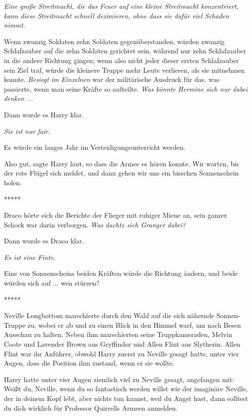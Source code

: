 \emph{Eine große Streitmacht, die das Feuer auf eine kleine Streitmacht
konzentriert, kann diese Streitmacht schnell dezimieren, ohne dass sie dafür
viel Schaden nimmt.}

Wenn zwanzig Soldaten zehn Soldaten gegenüberstanden, würden zwanzig
Schlafzauber auf die zehn Soldaten gerichtet sein, während nur zehn Schlafzauber
in die andere Richtung gingen; wenn also nicht jeder dieser ersten Schlafzauber
sein Ziel traf, würde die kleinere Truppe mehr Leute verlieren, als sie
mitnehmen konnte. \emph{Besiegt im Einzelnen} war der militärische Ausdruck für
das, was passierte, wenn man seine Kräfte so aufteilte. \emph{Was könnte Hermine
sich nur dabei denken ...}

Dann wurde es Harry klar.

\emph{Sie ist nur fair.}

Es würde ein langes Jahr im Verteidigungsunterricht werden.

\glqq{}Also gut\grqq{}, sagte Harry laut, so dass die Armee es hören konnte.
\glqq{}Wir warten, bis der rote Flügel sich meldet, und dann gehen wir uns ein
bisschen Sonnenschein holen.\grqq{}

\begin{center}*****\end{center}

Draco hörte sich die Berichte der Flieger mit ruhiger Miene an, sein ganzer
Schock war darin verborgen. \emph{Was dachte sich Granger dabei?}

Dann wurde es Draco klar.

\emph{Es ist eine Finte.}

Eine von Sonnenscheins beiden Kräften würde die Richtung ändern, und beide
würden sich auf ... wen stürzen?

\begin{center}*****\end{center}

Neville Longbottom marschierte durch den Wald auf die sich nähernde
Sonnen-Truppe zu, wobei er ab und zu einen Blick in den Himmel warf, um nach
Besen Ausschau zu halten. Neben ihm marschierten seine Truppkameraden, Melvin
Coote und Lavender Brown aus Gryffindor und Allen Flint aus Slytherin. Allen
Flint war ihr Anführer, obwohl Harry zuerst zu Neville gesagt hatte, unter vier
Augen, dass die Position ihm zustand, wenn er sie wollte.

Harry hatte unter vier Augen ziemlich viel zu Neville gesagt, angefangen mit:
\glqq{}Weißt du, Neville, wenn du so fantastisch werden willst wie der imaginäre
Neville, der in deinem Kopf lebt, aber nichts tun kannst, weil du Angst hast,
dann solltest du dich wirklich für Professor Quirrells Armeen anmelden.\grqq{}

